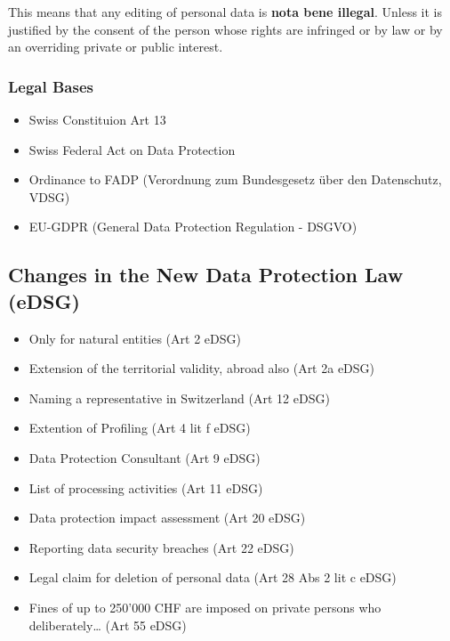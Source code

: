 \documentclass[11pt]{article}
\theoremstyle{definition}
\begin{document}
This means that any editing of personal data is \textbf{nota bene illegal}. Unless it is justified by the consent of the person whose rights are infringed or by law or by an overriding private or public interest.

\subsubsection{Legal Bases}
\begin{itemize}[label=-]
	\item Swiss Constituion Art 13
	\item Swiss Federal Act on Data Protection
	\item Ordinance to FADP (Verordnung zum Bundesgesetz über den Datenschutz, VDSG)
	\item EU-GDPR (General Data Protection Regulation - DSGVO)
\end{itemize}

\subsection{Changes in the New Data Protection Law (eDSG)}

\begin{itemize}[label=-]
	\item Only for natural entities (Art 2 eDSG)
	\item Extension of the territorial validity, abroad also (Art 2a eDSG)
	\item Naming a representative in Switzerland (Art 12 eDSG)
	\item Extention of Profiling (Art 4 lit f eDSG)
	\item Data Protection Consultant (Art 9 eDSG)
	\item List of processing activities (Art 11 eDSG)
	\item Data protection impact assessment (Art 20 eDSG)
	\item Reporting data security breaches (Art 22 eDSG)
	\item Legal claim for deletion of personal data (Art 28 Abs 2 lit c eDSG)
	\item Fines of up to 250'000 CHF are imposed on private persons who deliberately… (Art 55 eDSG)
\end{itemize}
\end{document}
